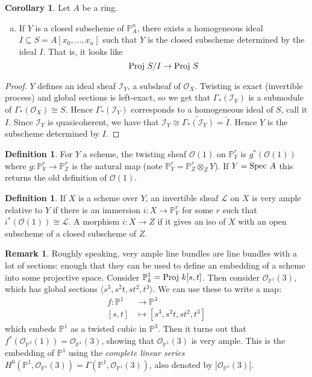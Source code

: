 \documentclass[10pt,reqno]{amsart}
\theoremstyle{definition}
\newtheorem{corollary}[theorem]{Corollary}
\newtheorem{definition}[theorem]{Definition}
\newtheorem{remark}[theorem]{Remark}
\theoremstyle{remark}
\numberwithin{equation}{section}
\numberwithin{theorem}{section}
\newcommand{\Z}{{\mathbb Z}}
\newcommand{\OO}{{\mathcal O}}
\newcommand{\spec}{\textup{Spec }}
\newcommand{\proj}{\textup{Proj }}
\newcommand{\II}{{\mathscr I}}
\newcommand{\wt}{\widetilde}
\newcommand{\PP}{{\mathbb P}}
\begin{document}
\begin{corollary} Let $A$ be a ring.
\begin{enumerate}[(a)]
\item If $Y$ is a closed subscheme of $\PP^n_A$, there exists a homogeneous ideal $I \subseteq S = A[x_0,\dots,x_n]$ such that $Y$ is the closed subscheme determined by the ideal $I$. That is, it looks like
\[\proj S/I \to \proj S\]
\end{enumerate}
\end{corollary}
\begin{proof}
$Y$ defines an ideal sheaf $\mathscr{I}_Y$, a subsheaf of $\OO_X$. Twisting is exact (invertible process) and global sections is left-exact, so we get that $\Gamma_*(\II_Y)$ is a submodule of $\Gamma_*(\OO_X) \cong S$. Hence $\Gamma_*(\II_Y)$ corresponds to a  homogeneous ideal of $S$, call it $I$. Since $\II_Y$ is quasicoherent, we have that $\II_Y \cong \wt{\Gamma_*(\II_Y)} = \wt{I}$. Hence $Y$ is the subscheme determined by $I$.

\end{proof}
\begin{definition} For $Y$ a scheme, the twisting sheaf $\OO(1)$ on $\PP^r_Y$ is $g^*(\OO(1))$ where $g: \PP_Y^r \to \PP^r_\Z$ is the natural map (note $\PP_Y^r = \PP_Z^r \otimes_Z Y$). If $Y = \spec A$ this returns the old definition of $\OO(1)$.
\end{definition}

\begin{definition} If $X$ is a scheme over $Y$, an invertible sheaf $\mathscr{L}$ on $X$ is very ample relative to $Y$ if there is an immersion $i:X \to \PP^r_Y$ for some $r$ such that $i^*(\OO(1)) \cong \mathscr{L}$. A morphism $i: X \to Z$ if it gives an iso of $X$ with an open subscheme of a closed subscheme of $Z$.
\end{definition}

\begin{remark} Roughly speaking, very ample line bundles are line bundles with a lot of sections: enough that they can be used to define an embedding of a scheme into some projective space. Consider $\PP^1_k = \proj k[s,t]$. Then consider $\OO_{\PP^1}(3)$, which has global sections $\langle s^3,s^2t,st^2,t^3\rangle$. We can use these to write a map:
\begin{align*}
f: \PP^1 &\to \PP^3\\
[s,t] & \mapsto [s^3,s^2t,st^2,t^3]
\end{align*}
which embeds $\PP^1$ as a twisted cubic in $\PP^3$. Then it turns out that $f^*(\OO_{\PP^3}(1)) = \OO_{\PP^1}(3)$, showing that $\OO_{\PP^1}(3)$ is very ample. This is the embedding of $\PP^1$ using the \textit{complete linear series} $H^0(\PP^1,\OO_{\PP^1}(3)) = \Gamma(\PP^1,\OO_{\PP^1}(3))$, also denoted by $|\OO_{\PP^1}(3)|$. 
\end{remark}
\end{document}
